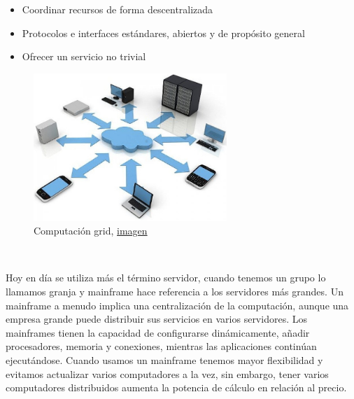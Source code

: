 \documentclass[paper=a4, fontsize=10pt]{scrartcl} %
\numberwithin{equation}{section} %
\numberwithin{figure}{section} %
\numberwithin{table}{section} %
\begin{document}
\begin{minipage}{\linewidth}
	\centering
	\begin{minipage}{0.45\linewidth}
		\begin{itemize}
			\item Coordinar recursos de forma descentralizada
			
			\item Protocolos e interfaces estándares, abiertos y de propósito general
			
			\item Ofrecer un servicio no trivial
		\end{itemize}
	\end{minipage}
	\hspace{0.1cm}
	\begin{minipage}{0.45\linewidth}
		\begin{figure}[H]
			\centering
			\label{grid-c}
			\includegraphics[width=0.65\textwidth]{./Imagenes/grid-c.jpg}
			\caption{Computación grid, \href{http://tongdaiao.com.vn/tong-dai-ao-la-su-hien-dien-cua-mot-doanh-nghiep-thanh-cong/}{imagen}}
		\end{figure}
	\end{minipage}
\end{minipage}

\

Hoy en día se utiliza más el término servidor, cuando tenemos un grupo lo llamamos granja y mainframe hace referencia a los servidores más grandes.
Un mainframe a menudo implica una centralización de la computación, aunque una empresa grande puede distribuir sus servicios en varios servidores.
Los mainframes tienen la capacidad de configurarse dinámicamente, añadir procesadores, memoria y conexiones, mientras las aplicaciones continúan ejecutándose.
Cuando usamos un mainframe tenemos mayor flexibilidad y evitamos actualizar varios computadores a la vez, sin embargo, tener varios computadores distribuidos aumenta la potencia de cálculo en relación al precio.
\end{document}
